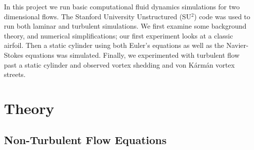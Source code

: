 \documentclass[10pt, titlepage]{article}
\begin{document}
In this project we run basic computational fluid dynamics simulations for two dimensional flows. The Stanford University Unstructured (SU$^2$) code was used to run both laminar and turbulent simulations. We first examine some background theory, and numerical simplifications; our first experiment looks at a classic airfoil. Then a static cylinder using both Euler's equations as well as the Navier-Stokes equations was simulated. Finally, we experimented with turbulent flow past a static cylinder and observed vortex shedding and von K\'{a}rm\'{a}n vortex streets.

\section{Theory}
\subsection{Non-Turbulent Flow Equations}
\end{document}
